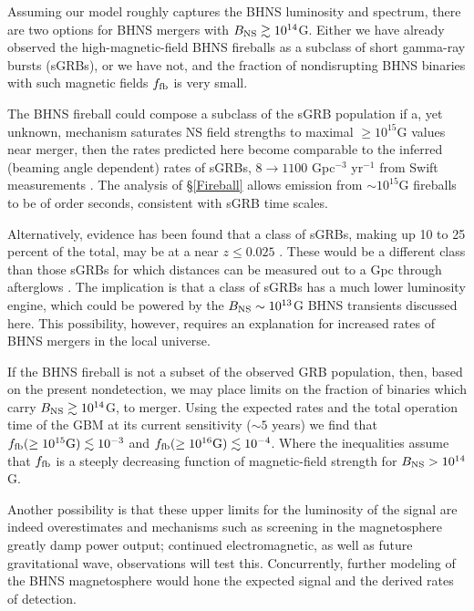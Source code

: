 Assuming our model roughly captures the BHNS luminosity and spectrum, there are two options for BHNS mergers with $B_{\rm{NS}} \gtrsim 10^{14}$G. Either we have already observed the high-magnetic-field BHNS fireballs as a subclass of short gamma-ray bursts (sGRBs), or we have not, and the fraction of nondisrupting BHNS binaries with such magnetic fields $f_{\rm{fb}}$ is very small.

The BHNS fireball could compose a subclass of the sGRB population if
a, yet unknown, mechanism saturates NS field strengths to maximal
$\geq 10^{15}$G values near merger, then the rates predicted here
become comparable to the inferred (beaming angle dependent) rates of
sGRBs, $8\rightarrow 1100$ Gpc$^{-3}$ yr$^{-1}$ from Swift measurements
\citep{SWIFTsGRBrates:2012}. The analysis of \S \ref{Fireball}
allows emission from $\sim10^{15}$G fireballs to be of order seconds,
consistent with sGRB time scales.



Alternatively, evidence has been found that a class of sGRBs, making
up 10 to 25 percent of the total, may be at a near $z \leq 0.025$
\cite{Tanvir:2005}. These would be a different class than those sGRBs
for which distances can be measured out to a Gpc through afterglows
\citep[{\em e.g.},][]{Berger:2005}. The implication is that a class of
sGRBs has a much lower luminosity engine, which could be powered by
the $B_{\rm{NS}} \sim 10^{13}$G BHNS transients discussed
here. This possibility, however, requires an
explanation for increased rates of BHNS mergers in the local universe.


If the BHNS fireball is not a subset of the observed GRB population,
then, based on the present nondetection, we may place limits on the
fraction of binaries which carry $B_{\rm{NS}} \gtrsim 10^{14}$G, to
merger. Using the expected rates and the total operation time of the
GBM at its current sensitivity ($\sim5$ years) we find that
$f_{\rm{fb}}(\geq 10^{15} \rm{G}) \lesssim 10^{-3}$ and
$f_{\rm{fb}}(\geq 10^{16} \rm{G}) \lesssim 10^{-4}$. Where the
inequalities assume that $f_{\rm{fb}}$ is a steeply decreasing
function of magnetic-field strength for $B_{\rm{NS}} > 10^{14}$G.


Another possibility is that these upper limits for the luminosity of
the signal are indeed overestimates and mechanisms such as screening
in the magnetosphere greatly damp power output; continued electromagnetic, as well as future gravitational wave, observations
will test this. Concurrently, further modeling of the BHNS
magnetosphere would hone the expected signal and the derived rates of
detection.



